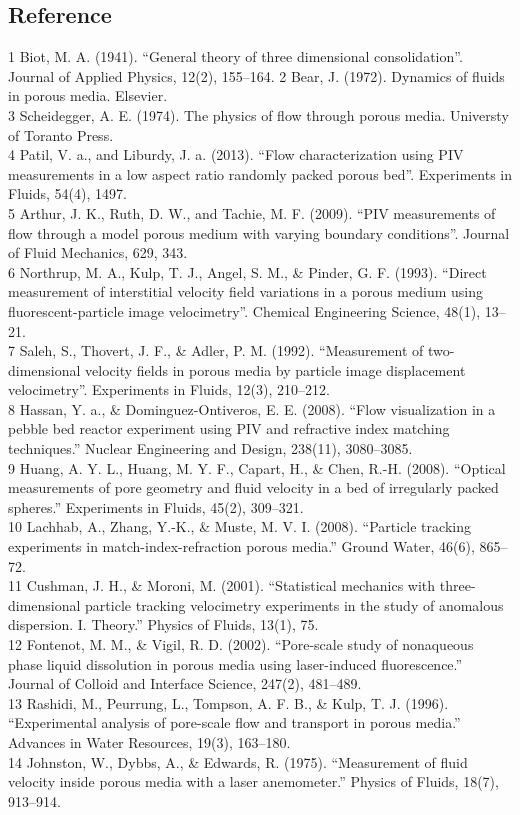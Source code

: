 \documentclass[letterpaper,12pt,titlepage,fleqn]{article}
\begin{document}
\begin{CJK}{UTF8}{gkai}
\section{Reference}
1	Biot, M. A. (1941). “General theory of three dimensional consolidation”. Journal of Applied Physics, 12(2), 155–164.
2	Bear, J. (1972). Dynamics of fluids in porous media. Elsevier. \\
3	Scheidegger, A. E. (1974). The physics of flow through porous media. Universty of Toranto Press.\\
4	Patil, V. a., and Liburdy, J. a. (2013). “Flow characterization using PIV measurements in a low aspect ratio randomly packed porous bed”. Experiments in Fluids, 54(4), 1497.\\
5	Arthur, J. K., Ruth, D. W., and Tachie, M. F. (2009). “PIV measurements of flow through a model porous medium with varying boundary conditions”. Journal of Fluid Mechanics, 629, 343.\\
6	Northrup, M. A., Kulp, T. J., Angel, S. M., \& Pinder, G. F. (1993). “Direct measurement of interstitial velocity field variations in a porous medium using fluorescent-particle image velocimetry”. Chemical Engineering Science, 48(1), 13–21.\\
7	Saleh, S., Thovert, J. F., \& Adler, P. M. (1992). “Measurement of two-dimensional velocity fields in porous media by particle image displacement velocimetry”. Experiments in Fluids, 12(3), 210–212.\\
8	Hassan, Y. a., \& Dominguez-Ontiveros, E. E. (2008). “Flow visualization in a pebble bed reactor experiment using PIV and refractive index matching techniques.” Nuclear Engineering and Design, 238(11), 3080–3085.\\
9	Huang, A. Y. L., Huang, M. Y. F., Capart, H., \& Chen, R.-H. (2008). “Optical measurements of pore geometry and fluid velocity in a bed of irregularly packed spheres.” Experiments in Fluids, 45(2), 309–321.\\
10	Lachhab, A., Zhang, Y.-K., \& Muste, M. V. I. (2008). “Particle tracking experiments in match-index-refraction porous media.” Ground Water, 46(6), 865–72.\\
11	Cushman, J. H., \& Moroni, M. (2001). “Statistical mechanics with three-dimensional particle tracking velocimetry experiments in the study of anomalous dispersion. I. Theory.” Physics of Fluids, 13(1), 75.\\
12	Fontenot, M. M., \& Vigil, R. D. (2002). “Pore-scale study of nonaqueous phase liquid dissolution in porous media using laser-induced fluorescence.” Journal of Colloid and Interface Science, 247(2), 481–489.\\
13	Rashidi, M., Peurrung, L., Tompson, A. F. B., \& Kulp, T. J. (1996). “Experimental analysis of pore-scale flow and transport in porous media.” Advances in Water Resources, 19(3), 163–180.\\
14	Johnston, W., Dybbs, A., \& Edwards, R. (1975). “Measurement of fluid velocity inside porous media with a laser anemometer.” Physics of Fluids, 18(7), 913–914.\\



\end{CJK}
\end{document}

